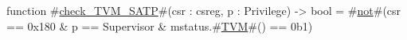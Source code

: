 function #\hyperref[sailRISCVzcheckzyTVMzySATP]{check\_TVM\_SATP}#(csr : csreg, p : Privilege) -> bool =
  #\hyperref[sailRISCVznot]{not}#(csr == 0x180 & p == Supervisor & mstatus.#\hyperref[sailRISCVzTVM]{TVM}#() == 0b1)
